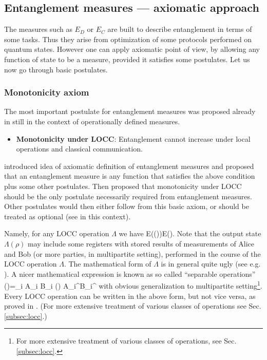 \documentclass[rmp,12pt,preprint]{revtex4-2}
\begin{document}
\subsection{Entanglement measures --- axiomatic approach}
The measures such as $E_D$ or $E_C$ are built to describe entanglement
in terms of some tasks. Thus they  arise  from optimization of some protocols performed
on quantum  states.  However one can apply axiomatic point of view, by allowing
any function of state to be a measure, provided it satisfies some postulates.
Let us now go through basic postulates.


\subsubsection{Monotonicity axiom}
The most important postulate for entanglement measures was proposed already in \cite{BDSW1996}  still in the context of operationally defined measures.

\begin{itemize}
    \item {\bf Monotonicity under LOCC}: Entanglement
cannot increase under local operations and classical communication.
\end{itemize}

\cite{VPRK1997} introduced idea of axiomatic definition of
entanglement measures and proposed that an entanglement
measure is any function that satisfies the above condition
plus some other postulates. Then
\cite{Vidal-mon2000} proposed that monotonicity
under LOCC should be the only postulate necessarily required from
entanglement measures. Other postulates would then either follow from
this basic axiom, or should be treated as optional
(see \cite{popescu-rohrlich} in this context).

Namely, for any LOCC operation $\Lambda$ we have
\be
E(\Lambda(\rho))\leq E(\rho).
\label{eq:mono}
\ee
Note that the output state  $\Lambda(\rho)$ may include some registers with stored
results of measurements of Alice and Bob (or more parties, in multipartite setting),
performed in the course
of the LOCC operation $\Lambda$. The mathematical form of $\Lambda$
is in general quite ugly (see e.g. \cite{DonaldHR2001}). A nicer mathematical expression is known as  so called ``separable operations'' \cite{Rains2001,VPRK1997}
\be
\Lambda(\rho)=\sum_i A_i \ot B_i (\rho) A_i^\dagger \ot B_i^\dagger
\ee
with obvious generalization to multipartite setting\footnote{For more extensive treatment of various classes of operations, see Sec. \ref{subsec:locc}.}.
Every LOCC operation can be written in the above form, but not vice versa, as proved
in \cite{Bennett-nlwe}. (For more extensive treatment of various classes of
operations see Sec. \ref{subsec:locc}.)
\end{document}
